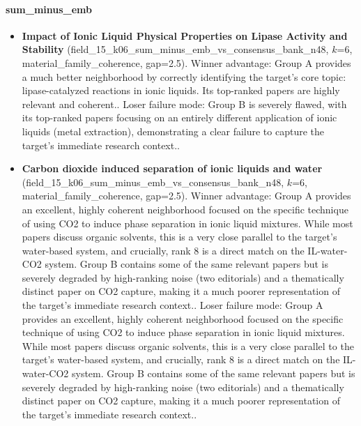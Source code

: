 \paragraph{sum\_minus\_emb}
\begin{itemize}
\item \textbf{Impact of Ionic Liquid Physical Properties on Lipase Activity and Stability} (field\_15\_k06\_sum\_minus\_emb\_vs\_consensus\_bank\_n48, $k$=6, material\_family\_coherence, gap=2.5). Winner advantage: Group A provides a much better neighborhood by correctly identifying the target's core topic: lipase-catalyzed reactions in ionic liquids. Its top-ranked papers are highly relevant and coherent.. Loser failure mode: Group B is severely flawed, with its top-ranked papers focusing on an entirely different application of ionic liquids (metal extraction), demonstrating a clear failure to capture the target's immediate research context..
\item \textbf{Carbon dioxide induced separation of ionic liquids and water} (field\_15\_k06\_sum\_minus\_emb\_vs\_consensus\_bank\_n48, $k$=6, material\_family\_coherence, gap=2.5). Winner advantage: Group A provides an excellent, highly coherent neighborhood focused on the specific technique of using CO2 to induce phase separation in ionic liquid mixtures. While most papers discuss organic solvents, this is a very close parallel to the target's water-based system, and crucially, rank 8 is a direct match on the IL-water-CO2 system. Group B contains some of the same relevant papers but is severely degraded by high-ranking noise (two editorials) and a thematically distinct paper on CO2 capture, making it a much poorer representation of the target's immediate research context.. Loser failure mode: Group A provides an excellent, highly coherent neighborhood focused on the specific technique of using CO2 to induce phase separation in ionic liquid mixtures. While most papers discuss organic solvents, this is a very close parallel to the target's water-based system, and crucially, rank 8 is a direct match on the IL-water-CO2 system. Group B contains some of the same relevant papers but is severely degraded by high-ranking noise (two editorials) and a thematically distinct paper on CO2 capture, making it a much poorer representation of the target's immediate research context..

\end{itemize}
